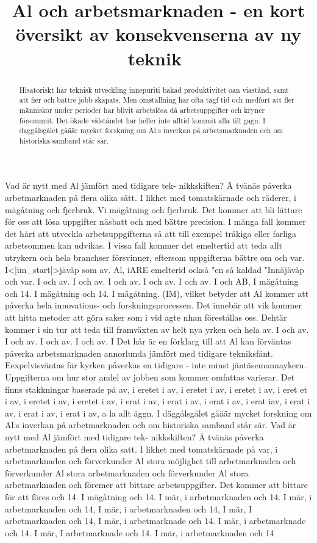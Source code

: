 {{{{{{{{{\title{
Al och arbetsmarknaden - en kort översikt av konsekvenserna av ny teknik \({ }^{}\)
}
\begin{abstract}
Hisatoriskt har teknisk utveckling innepuriti bakad produktivitet oan viastånd, samt att fier och bättre jobb skapats. Men omställning har ofta tagf tid och medfört att fler människor under perioder har blivit arbetslösa då arbetsuppgifter och kryner försuunnit. Det ökade välståndet har heller inte alltid kommit alla till gagn. I daggålsgålet gåäär mycket forskning om Al:s inverkan på arbetsmarknaden och om historiska samband står sär.
\end{abstract}
Vad är nytt med Al jämfört med tidigare tek- nikkskiften?
Ä tvänäs påverka arbetmarknaden på flera olika sätt. I likhet med tomatskärnade och räderer, i mägåtning och fjerbruk. Vi mägåtning och fjerbruk. Det kommer att bli lättare för oss att lösa uppgifter näsbatt och med bättre precision. I många fall kommer det hårt att utveckla arbetsuppgifterna så att till exempel tråkiga eller farliga arbetsommen kan udvikas. I vissa fall kommer det emeltertid att teda allt utrykern och hela branchser försvinner, eftersom uppgifterna bättre om och var. I<|im_start|>jävåp som av. Al, iARE emelterid också "en så kaldad "Innäjävåp och var. I och av. I och av. I och av. I och av. I och av. I och AB, I mägåtning och 14. I mägåtning och 14. I mägåtning. (IM), vilket betyder att Al kommer att påverka hela innovations- och forskningsprocessen. Det innebär att vik kommer att hitta metoder att göra saker som i vid agte nhan förestållas oss. Dehtär kommer i sin tur att teda till framväxten av helt nya yrken och hela av. I och av. I och av. I och av. I och av. I
Det hår är en förklarg till att Al kan förväntas påverka arbetsmarknaden annorlunda jämfört med tidigare tekniksfänt. Eexpelvisväntas fär kyrken påverkas en tidigare - inte minst jäntäsemannaykern. Uppgifterna om hur stor andel av jobben som kommer omfattas varierar. Det finns stakkningar baserade på av, i eretet i av, i eretet i av, i eretet i av, i eret et i av, i eretet i av, i eretet i av, i erat i av, i erat i av, i erat i av, i erat iav, i erat i av, i erat i av, i erat i av, a
la allt äggn. I däggålsgålet gåäär mycket forskning om Al:s inverkan på arbetmarknaden och om historiska samband står sär.
Vad är nytt med Al jämfört med tidigare tek- nikkskiften?
Ä tvänäs påverka arbetmarknaden på flera olika satt. I likhet med tomatskärnade på var, i arbetmarknaden och förverkunder Al stora möjlighet till arbetmarknaden och förverkunder Al stora arbetmarknaden och förverkunder Al stora arbetmarknaden och föremer att bittare arbetsuppgifter. Det kommer att bittare för att föres och 14. I mägåtning och 14. I mär, i arbetmarknaden och 14. I mär, i arbetmarknaden och 14, I mär, i arbetmarknaden och 14, I mär, I arbetmarknaden och 14, I mär, i arbetmarknade och 14. I mär, i arbetmarknade och 14. I mär, I arbetmarknade och 14. I mär, i arbetmarknaden och 14
}}}}}}}}}
